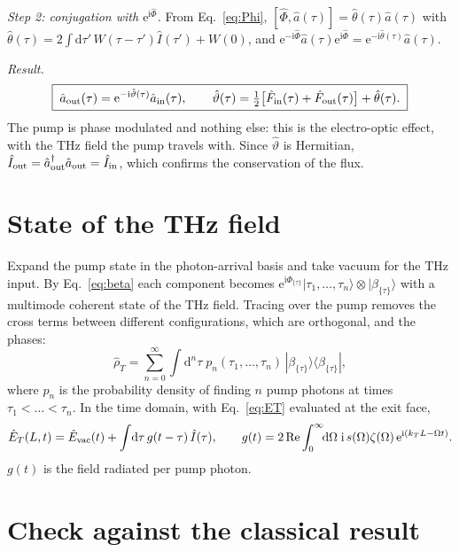 \documentclass[aps,pra,onecolumn,notitlepage,11pt,amsmath,amssymb,nofootinbib]{revtex4-2}
\newcommand{\Iop}{\hat I}
\newcommand{\dd}{\mathrm{d}}
\newcommand{\ee}{\mathrm{e}}
\newcommand{\ii}{\mathrm{i}}
\begin{document}
\emph{Step 2: conjugation with $\ee^{\ii\hat\Phi}$.} From
Eq.~\eqref{eq:Phi},
$[\hat\Phi,\hat a(\tau)]=\hat\theta(\tau)\hat a(\tau)$ with
$\hat\theta(\tau)=2\int\dd\tau'\,W(\tau-\tau')\Iop(\tau')+W(0)$, and
$\ee^{-\ii\hat\Phi}\hat a(\tau)\ee^{\ii\hat\Phi}=\ee^{-\ii\hat\theta(\tau)}\hat a(\tau)$.

\emph{Result.}
\begin{equation}
\boxed{\;\hat a_{\rm out}(\tau)=\ee^{-\ii\hat\vartheta(\tau)}\hat a_{\rm in}(\tau),\qquad
\hat\vartheta(\tau)=\tfrac12\big[\hat F_{\rm in}(\tau)+\hat F_{\rm out}(\tau)\big]
+\hat\theta(\tau).\;}
\label{eq:theta}
\end{equation}
The pump is phase modulated and nothing else: this is the electro-optic
effect, with the THz field the pump travels with. Since $\hat\vartheta$ is
Hermitian, $\Iop_{\rm out}=\hat a_{\rm out}^\dagger\hat a_{\rm out}=\Iop_{\rm in}$,
which confirms the conservation of the flux.

\section{State of the THz field}

Expand the pump state in the photon-arrival basis and take vacuum for the THz
input. By Eq.~\eqref{eq:beta} each component becomes
$\ee^{\ii\Phi_{\{\tau\}}}|\tau_1,\dots,\tau_n\rangle\otimes|\beta_{\{\tau\}}\rangle$
with a multimode coherent state of the THz field. Tracing over the pump
removes the cross terms between different configurations, which are
orthogonal, and the phases:
\begin{equation}
\hat\rho_T=\sum_{n=0}^\infty\int\!\dd^n\tau\;p_n(\tau_1,\dots,\tau_n)\,
|\beta_{\{\tau\}}\rangle\langle\beta_{\{\tau\}}| ,
\end{equation}
where $p_n$ is the probability density of finding $n$ pump photons at times
$\tau_1<\dots<\tau_n$. In the time domain, with Eq.~\eqref{eq:ET} evaluated
at the exit face,
\begin{equation}
\hat E_T(L,t)=\hat E_{\rm vac}(t)+\int\!\dd\tau\,g(t-\tau)\,\Iop(\tau),\qquad
g(t)=2\,\mathrm{Re}\int_0^\infty\!\!\dd\Omega\;\ii\,s(\Omega)\zeta(\Omega)\,
\ee^{\ii(k_TL-\Omega t)} .
\label{eq:g}
\end{equation}
$g(t)$ is the field radiated per pump photon.

\section{Check against the classical result}
\label{sec:classical}
\end{document}

